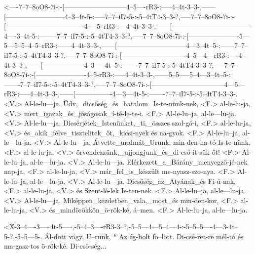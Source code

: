   {<----7--7--8oO8-7i-:-[---------------------------4--5----rR3-:-----4--4t-3--3-,------[--------------------------4--3--4t-5-:-----7--7--iI7-5-:-5--4tT4-3--3-?,-----7--7--8oO8-7i-:-[----------------------------------4----5--rR3-:---4--4t-3--3-,------[-----------------------------------4----3--4t-5-:--------7--7--iI7-5-:-5--4tT4-3--3-?,-----7--7--8oO8-7i-:-[----------------------5---5---5--5--4--5--rR3-:------4--4t-3--3-,------[------------------------------4---3--4t--5-:------7--7--iI7-5-:-5--4tT4-3--3-?,-----7--7--8oO8-7i-:-[----------------------------4--5---4---rR3-:----4--4t-3--3-,------[------------------4--3-----4t--5-:-------7--7--iI7-5-:-5--4tT4-3--3-?,-----7--7--8oO8-7i-:-[----------------------4--5-rR3-:-----4--4t-3--3-,------5--5-----5--4---3--4t--5-:-------7--7--iI7-5-:-5--4tT4-3--3-?,-----7--7--8oO8-7i-:-[--------------------------------4---5---rR3-:-----4--4t-3--3-,------[----------------4---3---4t-5-:-------7--7--iI7-5-:-5--4tT4-3--3-.}
  {<V.> Al-le-lu---ja.  Üdv,_dicsőség_és_hatalom_Is-te-nünk-nek, <F.> al-le-lu-ja, <V.> mert_igazak_és_jóságosak_í-té-le-te-i. <F.> Al-le-lu--ja, al-le---lu-ja. <V.> Al-le-lu---ja.  Dicsérjétek_Istenünket,_ti,_összes szol-gá-i, <F.> al-le-lu-ja, <V.> és_akik_félve_tisztelitek_őt,_kicsi-nyek és na-gyok. <F.> Al-le-lu--ja, al-le---lu-ja. <V.> Al-le-lu---ja.  Átvette_uralmát_Urunk, min-den-ha-tó Is-te-nünk, <F.> al-le-lu-ja, <V.> örvendezzünk,_ujjongjunk_és_di-cső-ít-sük őt! <F.> Al-le-lu--ja, al-le---lu-ja. <V.> Al-le-lu---ja.  Elérkezett_a_Bárány_menyegző-jé-nek nap-ja, <F.> al-le-lu-ja, <V.> már_fel_is_készült me-nyasz-szo-nya. <F.> Al-le-lu--ja, al-le---lu-ja. <V.> Al-le-lu---ja.  Dicsőség_az_Atyának_és Fi-ú-nak, <F.> al-le-lu-ja, <V.> és Szent-lé-lek Is-ten-nek. <F.> Al-le-lu--ja, al-le---lu-ja. <V.> Al-le-lu---ja.  Miképpen_kezdetben_vala,_most_és min-den-kor, <F.> al-le-lu-ja, <V.> és_mindörökkön_ö-rök-ké, á--men. <F.> Al-le-lu--ja, al-le---lu-ja.}

  {<X-3--4----3-----4t-5-----,-5--4--3----rR3-3--?,-5--5---4---5--4---4-:-5--5--5----4---3-4t--5-?,-5--5---5-.}
  {   Ál-dott vagy, U--runk, * Az ég-bolt fö--lött. Di-csé-ret-re mél-tó  és ma-gasz-tos ö-rök-ké.  Di-cső-ség...}




